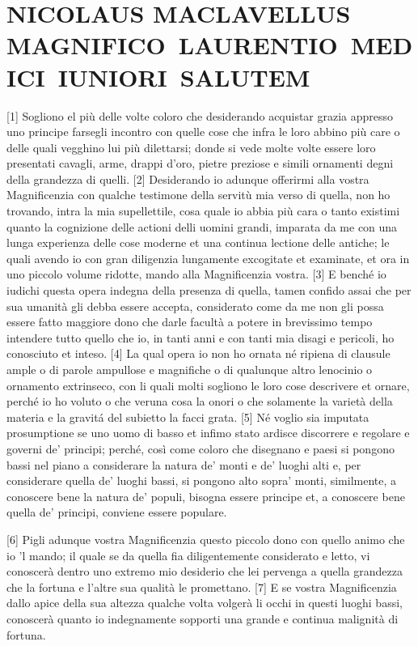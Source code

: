 \section*{NICOLAUS MACLAVELLUS MAGNIFICO~LAURENTIO~MEDICI~IUNIORI~SALUTEM}

{[}1{]} Sogliono el più delle volte coloro che desiderando acquistar
grazia appresso uno principe farsegli incontro con quelle cose che infra
le loro abbino più care o delle quali vegghino lui più dilettarsi; donde
si vede molte volte essere loro presentati cavagli, arme, drappi d'oro,
pietre preziose e simili ornamenti degni della grandezza di quelli.
{[}2{]} Desiderando io adunque offerirmi alla vostra Magnificenzia con
qualche testimone della servitù mia verso di quella, non ho trovando,
intra la mia supellettile, cosa quale io abbia più cara o tanto existimi
quanto la cognizione delle actioni delli uomini grandi, imparata da me
con una lunga experienza delle cose moderne et una continua lectione
delle antiche; le quali avendo io con gran diligenzia lungamente
excogitate et examinate, et ora in uno piccolo volume ridotte, mando
alla Magnificenzia vostra. {[}3{]} E benché io iudichi questa opera
indegna della presenza di quella, tamen confido assai che per sua
umanità gli debba essere accepta, considerato come da me non gli possa
essere fatto maggiore dono che darle facultà a potere in brevissimo
tempo intendere tutto quello che io, in tanti anni e con tanti mia
disagi e pericoli, ho conosciuto et inteso. {[}4{]} La qual opera io non
ho ornata né ripiena di clausule ample o di parole ampullose e
magnifiche o di qualunque altro lenocinio o ornamento extrinseco, con li
quali molti sogliono le loro cose descrivere et ornare, perché io ho
voluto o che veruna cosa la onori o che solamente la varietà della
materia e la gravitá del subietto la facci grata. {[}5{]} Né voglio sia
imputata prosumptione se uno uomo di basso et infimo stato ardisce
discorrere e regolare e governi de' principi; perché, così come coloro
che disegnano e paesi si pongono bassi nel piano a considerare la natura
de' monti e de' luoghi alti e, per considerare quella de' luoghi bassi,
si pongono alto sopra' monti, similmente, a conoscere bene la natura de'
populi, bisogna essere principe et, a conoscere bene quella de'
principi, conviene essere populare.

{[}6{]} Pigli adunque vostra Magnificenzia questo piccolo dono con
quello animo che io 'l mando; il quale se da quella fia diligentemente
considerato e letto, vi conoscerà dentro uno extremo mio desiderio che
lei pervenga a quella grandezza che la fortuna e l'altre sua qualità le
promettano. {[}7{]} E se vostra Magnificenzia dallo apice della sua
altezza qualche volta volgerà li occhi in questi luoghi bassi, conoscerà
quanto io indegnamente sopporti una grande e continua malignità di
fortuna.

